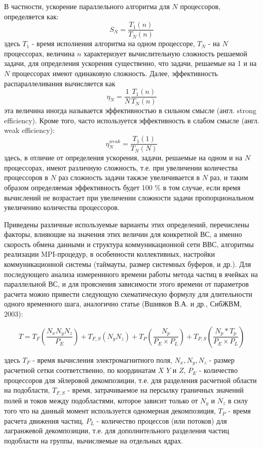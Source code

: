 			В частности, ускорение параллельного алгоритма для $N$ процессоров, определяется как:
			$$
			S_N = \frac{T_1(n)}{T_N(n)}
			$$  
			здесь $T_1$ - время исполнения алгоритма на одном процессоре, $T_N$ - на $N$ процессорах, величина $n$ характеризует вычислительную сложность решаемой задачи, для определения ускорения существенно, что задачи, решаемые на 1 и на $N$ процессорах имеют одинаковую сложность.
			Далее, эффективность распараллеливания вычисляется как
			$$
			\eta_N = \frac{1}{N}\frac{T_1(n)}{T_N(n)}
			$$  
			эта величина иногда называется эффективностью в сильном смысле (англ. strong efficiency). Кроме того, часто используется эффективность в слабом смысле (англ. weak efficiency):
			\begin{equation}
			\label{weak_eff}
			\eta^{weak}_N = \frac{T_1(1)}{T_N(N)}
			\end{equation}
			здесь, в отличие от определения ускорения, задачи, решаемые на одном и на $N$ процессорах, имеют различную сложность, т.е. при увеличении количества процессоров в $N$ раз сложность задачи такжэе увеличивается в $N$ раз, и таким образом определяемая эффективность будет 100 \% в том случае, если время вычислений не возрастает при увеличении сложности задачи пропорциональном увеличению количества процессоров.   
			
			Приведены различные используемые варианты этих определений, перечислены факторы, влияющие на  значения этих величин для конкретной ВС, а именно скорость обмена данными и структура коммуникационной сети ВВС, алгоритмы реализации MPI-процедур, в особенности коллективных, настройки коммуникационной системы (таймауты, размер системных буферов, и др.).
			Для последующего анализа измереннного времени работы метода частиц в ячейках на параллельной ВС, и для прояснения зависимости этого времени от параметров расчета можно привести следующую схематическую формулу для длительности одного временного шага, аналогично статье (Вшивков В.А. и др., СибЖВМ, 2003):
			
			\begin{equation}
			\label{PIC-timestep}
			T=T_{F} \left ( \frac{N_x N_y N_z }{P_E}\right )+ T_{F,S}\left (N_y N_z\right ) + T_P\left(\frac{N_p}{P_E\times P_L}\right) +T_{P,S}\left (\frac{N_p*T_p}{P_E\times P_L}\right)
		\end{equation}
			 
		здесь $T_{F}$ - время вычисления электромагнитного поля, $N_x, N_y, N_z$ - размер расчетной сетки соответственно, по координатам $X$ $Y$ и $Z$, $P_E$ - количество процессоров для эйлеровой декомпозиции, т.е. для разделения расчетной области на подобласти, $T_{F,S}$ - время, затрачиваемое на персылку граничных значений полей и токов между подобластями, которое зависит только от $N_y$ и $N_z$ в силу того что на данный момент используется одномерная декомпозиция,  $T_P$ - время расчета движения частиц, $P_L$ - количество процессов (или потоков) для лагранжевой декомпозиции, т.е. для дополнительного разделения частиц подобласти на группы, вычисляемые на отдельных ядрах.
		
